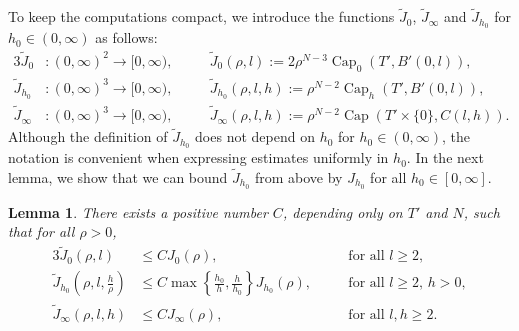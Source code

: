 \documentclass{article}
\numberwithin{equation}{section}
\newtheorem{lemma}[theorem]{Lemma}
\theoremstyle{definition}
\theoremstyle{remark}
\newcommand{\cpct}{\operatorname{Cap}}
\begin{document}
To keep the computations compact, we introduce the functions $\tilde{J}_0$, $\tilde{J}_\infty$ and $\tilde{J}_{h_0}$ for $h_0 \in (0, \infty)$ as follows:
\begin{alignat*}{3}
    \tilde{J}_0 &: (0, \infty)^2 \rightarrow [0, \infty), &\quad  &\tilde{J}_0(\rho, l) := 2 \rho^{N - 3} \cpct_0(T', B'(0, l)), \\
    \tilde{J}_{h_0} &: (0, \infty)^3 \rightarrow [0, \infty), &\quad &\tilde{J}_{h_0}(\rho, l, h) := \rho^{N - 2} \cpct_h(T', B'(0, l)), \\
    \tilde{J}_\infty &: (0, \infty)^3 \rightarrow [0, \infty), &\quad &\tilde{J}_\infty(\rho, l, h) := \rho^{N - 2} \cpct(T' \times \{0\}, C(l, h)).
\end{alignat*}
Although the definition of $\tilde{J}_{h_0}$ does not depend on $h_0$ for $h_0 \in (0, \infty)$, the notation is convenient when expressing estimates uniformly in $h_0$. In the next lemma, we show that we can bound $\tilde{J}_{h_0}$ from above by $J_{h_0}$ for all $h_0 \in [0, \infty]$.

\begin{lemma} \label{lm:comparison_old_and_new}
    There exists a positive number $C$, depending only on $T'$ and $N$, such that for all $\rho > 0$,
    \begin{alignat}{3} \label{eq:upper_bound_zero}
        \tilde{J}_0(\rho, l) &\le C J_0(\rho), &\quad &\text{for all } l \ge 2, \\ \label{eq:upper_bound_finite}
        \tilde{J}_{h_0}\left(\rho, l, \frac{h}{\rho}\right) &\le C \max \left\{\frac{h_0}{h}, \frac{h}{h_0}\right\} J_{h_0}(\rho), &\quad &\text{for all } l \ge 2, \, h > 0, \\ \label{eq:upper_bound_infinity}
        \tilde{J}_\infty(\rho, l, h) &\le C J_\infty(\rho), &\quad &\text{for all } l, h \ge 2.
    \end{alignat}
    
\end{lemma}
\end{document}
